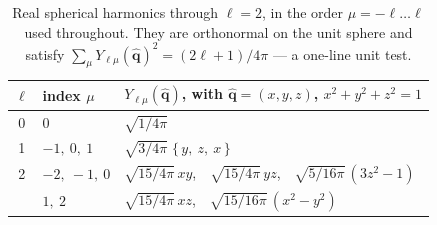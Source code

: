 \begin{table}[htbp]
\centering
\begin{tabular}{@{}cll@{}}
\toprule
$\ell$ & index $\mu$ & $Y_{\ell\mu}(\hat{\mathbf q})$, with
$\hat{\mathbf q} = (x,y,z)$, $x^2+y^2+z^2=1$\\
\midrule
0 & $0$ & $\sqrt{1/4\pi}$\\
1 & $-1,\ 0,\ 1$ & $\sqrt{3/4\pi}\;\{\,y,\ z,\ x\,\}$\\
2 & $-2,\ -1,\ 0$ & $\sqrt{15/4\pi}\,xy$,\ \ $\sqrt{15/4\pi}\,yz$,\ \
$\sqrt{5/16\pi}\,(3z^2-1)$\\
  & $1,\ 2$ & $\sqrt{15/4\pi}\,xz$,\ \ $\sqrt{15/16\pi}\,(x^2-y^2)$\\
\bottomrule
\end{tabular}
\caption{Real spherical harmonics through $\ell=2$, in the order
$\mu = -\ell\dots\ell$ used throughout. They are orthonormal on the unit
sphere and satisfy $\sum_\mu Y_{\ell\mu}(\hat{\mathbf q})^2 =
(2\ell+1)/4\pi$ --- a one-line unit test.}
\label{tab:realylm}
\end{table}
